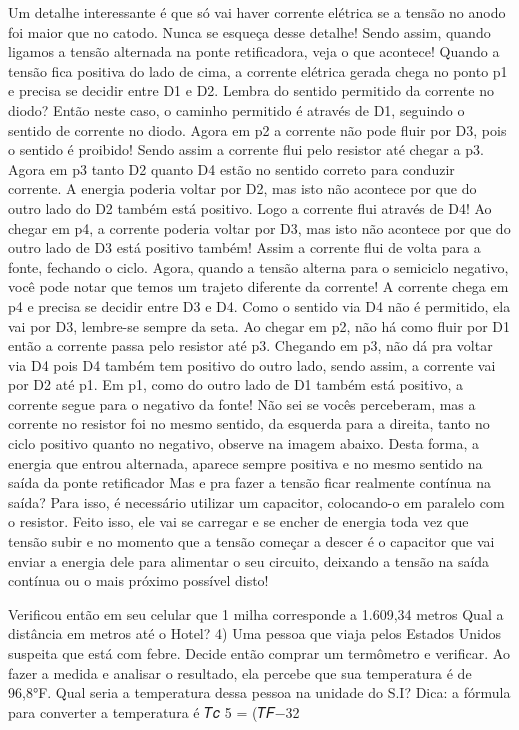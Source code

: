 \documentclass[a4paper,12pt]{article}
\begin{document}
Um detalhe interessante é que só vai haver corrente elétrica se a tensão no anodo foi maior que no catodo. Nunca se esqueça desse detalhe! Sendo assim, quando ligamos a tensão alternada na ponte retificadora, veja o que acontece! Quando a tensão fica positiva do lado de cima, a corrente elétrica gerada chega no ponto p1 e precisa se decidir entre D1 e D2.
Lembra do sentido permitido da corrente no diodo? Então neste caso, o caminho permitido é através de D1, seguindo o sentido de corrente no diodo.
Agora em p2 a corrente não pode fluir por D3, pois o sentido é proibido! Sendo assim a corrente flui pelo resistor até chegar a p3.
Agora em p3 tanto D2 quanto D4 estão no sentido correto para conduzir corrente. A energia poderia voltar por D2, mas isto não acontece por que do outro lado do D2 também está positivo. Logo a corrente flui através de D4!
Ao chegar em p4, a corrente poderia voltar por D3, mas isto não acontece por que do outro lado de D3 está positivo também! Assim a corrente flui de volta para a fonte, fechando o ciclo.
Agora, quando a tensão alterna para o semiciclo negativo, você pode notar que temos um trajeto diferente da corrente! A corrente chega em p4 e precisa se decidir entre D3 e D4.
Como o sentido via D4 não é permitido, ela vai por D3, lembre-se sempre da seta.
Ao chegar em p2, não há como fluir por D1 então a corrente passa pelo resistor até p3.
Chegando em p3, não dá pra voltar via D4 pois D4 também tem positivo do outro lado, sendo assim, a corrente vai por D2 até p1.
Em p1, como do outro lado de D1 também está positivo, a corrente segue para o negativo da fonte!
Não sei se vocês perceberam, mas a corrente no resistor foi no mesmo sentido, da esquerda para a direita, tanto no ciclo positivo quanto no negativo, observe na imagem abaixo. Desta forma, a energia que entrou alternada, aparece sempre positiva e no mesmo sentido na saída da ponte retificador
Mas e pra fazer a tensão ficar realmente contínua na saída? Para isso, é necessário utilizar um capacitor, colocando-o em paralelo com o resistor. Feito isso, ele vai se carregar e se encher de energia toda vez que tensão subir e no momento que a tensão começar a descer é o capacitor que vai enviar a energia dele para alimentar o seu circuito, deixando a tensão na saída contínua ou o mais próximo possível disto!



Verificou então em seu celular que 1 milha corresponde a 1.609,34 metros
Qual a distância em metros até o Hotel?
4) Uma pessoa que viaja pelos Estados Unidos suspeita que está com febre. Decide então 
comprar um termômetro e verificar. Ao fazer a medida e analisar o resultado, ela 
percebe que sua temperatura é de 96,8°F.
Qual seria a temperatura dessa pessoa na unidade do S.I?
Dica: a fórmula para converter a temperatura é 𝑇𝑐
5
=
(𝑇𝐹−32
\end{document}
